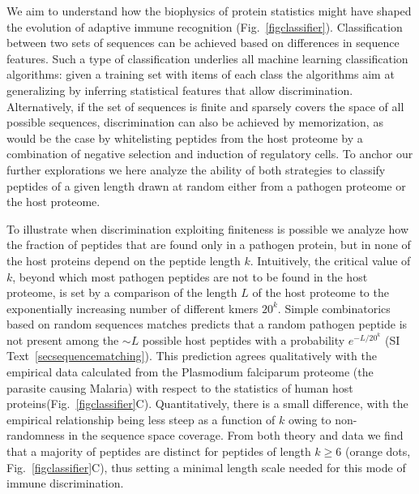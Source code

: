 \documentclass[superscriptaddress,twocolumn,pre]{revtex4}
\newcommand{\<}{\langle}
\renewcommand{\>}{\rangle}
\begin{document}
We aim to understand how the biophysics of protein statistics might have shaped the evolution of adaptive immune recognition (Fig.~\ref{figclassifier}). Classification between two sets of sequences can be achieved based on differences in sequence features. Such a type of classification underlies all machine learning classification algorithms: given a training set with items of each class the algorithms aim at generalizing by inferring statistical features that allow discrimination. Alternatively, if the set of sequences is finite and sparsely covers the space of all possible sequences, discrimination can also be achieved by memorization, as would be the case by whitelisting peptides from the host proteome by a combination of negative selection and induction of regulatory cells. To anchor our further explorations we here analyze the ability of both strategies to classify peptides of a given length drawn at random either from a pathogen proteome or the host proteome.

To illustrate when discrimination exploiting finiteness is possible we analyze how the fraction of peptides that are found only in a pathogen protein, but in none of the host proteins depend on the peptide length $k$. Intuitively, the critical value of $k$, beyond which most pathogen peptides are not to be found in the host proteome, is set by a comparison of the length $L$ of the host proteome to the exponentially increasing number of different kmers $20^k$. Simple combinatorics based on random sequences matches predicts that a random pathogen peptide is not present among the $\sim L$ possible host peptides with a probability $e^{-L/20^k}$ (SI Text~\ref{secsequencematching}). This prediction agrees qualitatively with the empirical data calculated from the Plasmodium falciparum proteome (the parasite causing Malaria) with respect to the statistics of human host proteins(Fig.~\ref{figclassifier}C). Quantitatively, there is a small difference, with the empirical relationship being less steep as a function of $k$ owing to non-randomness in the sequence space coverage. From both theory and data we find that a majority of peptides are distinct for peptides of length $k\geq6$ (orange dots, Fig.~\ref{figclassifier}C), thus setting a minimal length scale needed for this mode of immune discrimination.  
\end{document}
